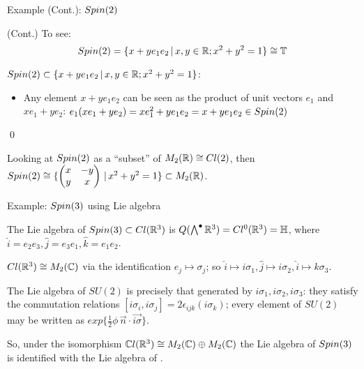 \begin{frame}{Example (Cont.): $Spin(2)$} %
    
    (Cont.) To see: \[Spin(2) = \{x + y e_1 e_2 \,|\, x, y \in \mathbb R;  x^2 + y^2 = 1\} \cong \mathbb T\]
    
    $Spin(2) \subset \{x + y e_1 e_2 \,|\, x, y \in \mathbb R;  x^2 + y^2 = 1\}$:
        
        \begin{itemize}
        
        \item Any element $x + y e_1 e_2$ can be seen as the product of unit vectors $e_1$ and $x e_1 + y e_2$: $e_1 (x e_1 + y e_2) = x e_1^2 + y e_1 e_2 = x + y e_1 e_2 \in Spin(2)$
            
        \end{itemize}
    \qed
    
    Looking at $Spin(2)$ as a ``subset'' of $M_2(\mathbb R) \cong Cl(2)$, then $Spin(2) \cong \{\begin{pmatrix} x & -y \\ y & x \end{pmatrix} \,|\, x^2 + y^2 = 1\} \subset M_2(\mathbb R)$.
    
\end{frame}

\begin{frame}{Example: $Spin(3)$ using Lie algebra} %

    The Lie algebra of $Spin(3) \subset Cl(\mathbb R^3)$ is $Q(\bigwedge^\bullet \mathbb R^3) = Cl^0(\mathbb R^3) = \mathbb H$, where $\hat i = e_2 e_3, \hat j = e_3 e_1, \hat k = e_1 e_2$.
    
    $Cl(\mathbb R^3) \cong M_2(\mathbb C)$ via the identification $e_j \mapsto \sigma_j$; so $\hat i \mapsto i \sigma_1, \hat j \mapsto i \sigma_2, \hat i \mapsto k \sigma_3$.
    
    The Lie algebra of $SU(2)$ is precisely that generated by $i\sigma_1, i\sigma_2, i\sigma_3$: they satisfy the commutation relations $[i\sigma_i, i \sigma_j] = 2 \epsilon_{ijk} (i \sigma_k)$; every element of $SU(2)$ may be written as $exp\{\frac{1}{2} \phi \, \vec n \cdot \vec{i \sigma}\}$.
    
    So, under the isomorphism $\mathbb C l(\mathbb R^3) \cong M_2(\mathbb C) \oplus M_2(\mathbb C)$ the Lie algebra of $Spin(3)$ is identified with the Lie algebra of .
    
\end{frame}

